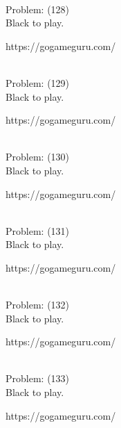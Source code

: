 \documentclass[11pt]{article}
\begin{document}
\begin{minipage}[t]{0.5\textwidth}
  {\centering
  
\\
  Problem: (128)\\
  Black to play.

https://gogameguru.com/\\
  }
\end{minipage}
\begin{minipage}[t]{0.5\textwidth}
  {\centering
  
\\
  Problem: (129)\\
  Black to play.

https://gogameguru.com/\\
  }
\end{minipage}
\begin{minipage}[t]{0.5\textwidth}
  {\centering
  
\\
  Problem: (130)\\
  Black to play.

https://gogameguru.com/\\
  }
\end{minipage}
\begin{minipage}[t]{0.5\textwidth}
  {\centering
  
\\
  Problem: (131)\\
  Black to play.

https://gogameguru.com/\\
  }
\end{minipage}
\begin{minipage}[t]{0.5\textwidth}
  {\centering
  
\\
  Problem: (132)\\
  Black to play.

https://gogameguru.com/\\
  }
\end{minipage}
\begin{minipage}[t]{0.5\textwidth}
  {\centering
  
\\
  Problem: (133)\\
  Black to play.

https://gogameguru.com/\\
  }
\end{minipage}
\end{document}
